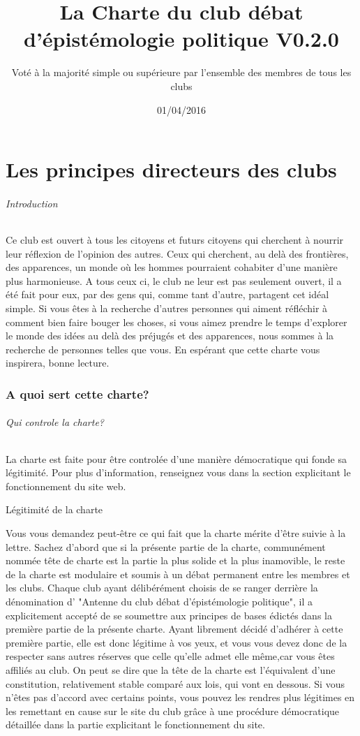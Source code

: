 \documentclass[a4paper,12pt]{article}
\title{\Huge{La Charte du club débat d'épistémologie politique} \LARGE{V0.2.0}}
\author{Voté à la majorité simple ou supérieure par l'ensemble des membres de tous les clubs}
\date{01/04/2016}
\begin{document}
\maketitle
\tableofcontents
\newpage

\part{Les principes directeurs des clubs}
\paragraph{Introduction}
Ce club est ouvert à tous les citoyens et futurs citoyens qui cherchent à nourrir leur réflexion de l'opinion des autres. Ceux qui cherchent, au delà des frontières, des apparences, un monde où les hommes pourraient cohabiter d'une manière plus harmonieuse. A tous ceux ci, le club ne leur est pas seulement ouvert, il a été fait pour eux, par des gens qui, comme tant d'autre, partagent cet idéal simple. Si vous êtes à la recherche d'autres personnes qui aiment réfléchir à comment bien faire bouger les choses, si vous aimez prendre le temps d'explorer le monde des idées au delà des préjugés et des apparences, nous sommes à la recherche de personnes telles que vous. En espérant que cette charte vous inspirera, bonne lecture.

\section{A quoi sert cette charte?}

\paragraph{Qui controle la charte?}
La charte est faite pour être controlée d'une manière démocratique qui fonde sa légitimité. Pour plus d'information, renseignez vous dans la section explicitant le fonctionnement du site web.
\subparagraph{Légitimité de la charte}
Vous vous demandez peut-être ce qui fait que la charte mérite d'être suivie à la lettre. Sachez d'abord que si la présente partie de la charte, communément nommée tête de charte est la partie la plus solide et la plus inamovible, le reste de la charte est modulaire et soumis à un débat permanent entre les membres et les clubs. Chaque club ayant délibérément choisis de se ranger derrière la dénomination d' "Antenne du club débat d'épistémologie politique", il a explicitement accepté de se soumettre aux principes de bases édictés dans la première partie de la présente charte. Ayant librement décidé d'adhérer à cette première partie, elle est donc légitime à vos yeux, et vous vous devez donc de la respecter sans autres réserves que celle qu'elle admet elle même,car vous êtes affiliés au club. On peut se dire que la tête de la charte est l'équivalent d'une constitution, relativement stable comparé aux lois, qui vont en dessous. Si vous n'êtes pas d'accord avec certains points, vous pouvez les rendres plus légitimes en les remettant en cause sur le site du club grâce à une procédure démocratique détaillée dans la partie explicitant le fonctionnement du site.
\end{document}
